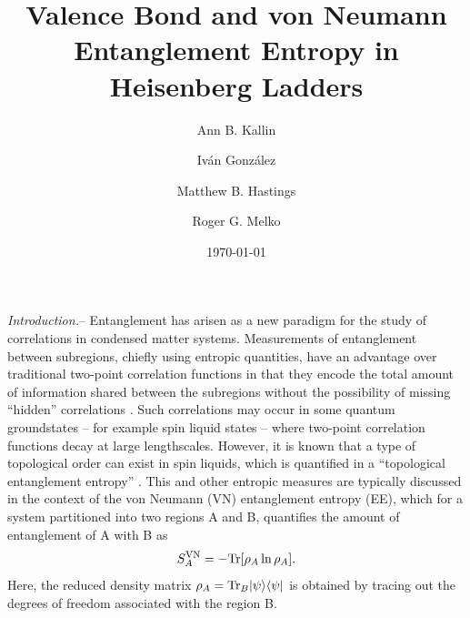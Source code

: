 \documentclass[prl,aps,twocolumn,floatfix,amsmath,amssymb,superscriptaddress,tightenlines]{revtex4}
\begin{document}
\date{\today}
\title{Valence Bond and von Neumann Entanglement Entropy in Heisenberg Ladders}
\author{Ann B. Kallin}

\author{Iv\'an Gonz\'alez}

\author{Matthew B. Hastings}

\author{Roger G. Melko}

\begin{abstract}

\end{abstract}
\maketitle


{\it Introduction.}-- Entanglement has arisen 
as a new paradigm for the study of correlations in condensed matter systems.  
Measurements
of entanglement between subregions, chiefly using entropic
quantities, have an advantage over traditional two-point correlation
functions in that they encode the total amount of information shared
between the subregions without the possibility of missing ``hidden''
correlations \cite{wolf}.  Such correlations may occur in some
quantum groundstates --  for example spin liquid states -- 
where two-point correlation functions decay at large lengthscales.
However, it is known that a type of topological order can exist in
spin liquids, which is quantified in a ``topological entanglement
entropy''  \cite{ KP, LW}.
This and other entropic measures are typically discussed in the context of
the von Neumann (VN) entanglement entropy (EE), which for a system partitioned into
two regions A and B, quantifies the amount of entanglement of A with B as
\begin{equation} 
S^{\rm VN}_A = - {\rm Tr} [ \rho_A \ln \rho_A ]. \label{vNEE} 
\end{equation}
Here, the reduced density matrix $\rho_A = {\rm Tr}_B | \psi \rangle
\langle \psi |$ is obtained by tracing out the degrees of freedom
associated with the region B.
\end{document}
